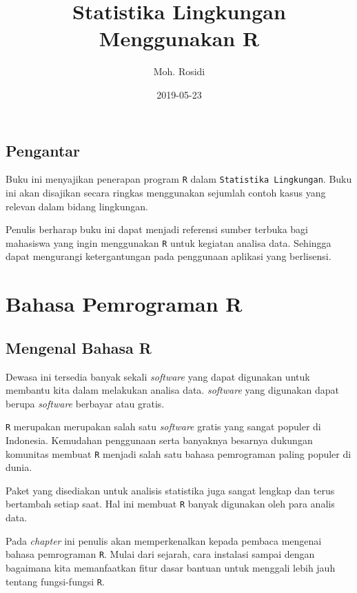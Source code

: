 \documentclass[]{book}
\title{Statistika Lingkungan Menggunakan R}
\author{Moh. Rosidi}
\date{2019-05-23}
\begin{document}
\maketitle

{
\hypersetup{linkcolor=black}
\setcounter{tocdepth}{1}
\tableofcontents
}
\listoftables
\listoffigures
\chapter*{Pengantar}\label{pengantar}

Buku ini menyajikan penerapan program \texttt{R} dalam
\texttt{Statistika\ Lingkungan}. Buku ini akan disajikan secara ringkas
menggunakan sejumlah contoh kasus yang relevan dalam bidang lingkungan.

Penulis berharap buku ini dapat menjadi referensi sumber terbuka bagi
mahasiswa yang ingin menggunakan \texttt{R} untuk kegiatan analisa data.
Sehingga dapat mengurangi ketergantungan pada penggunaan aplikasi yang
berlisensi.

\part*{Bahasa Pemrograman R}\label{part-bahasa-pemrograman-r}

\chapter{Mengenal Bahasa R}\label{mengenal-bahasa-r}

Dewasa ini tersedia banyak sekali \emph{software} yang dapat digunakan
untuk membantu kita dalam melakukan analisa data. \emph{software} yang
digunakan dapat berupa \emph{software} berbayar atau gratis.

\texttt{R} merupakan merupakan salah satu \emph{software} gratis yang
sangat populer di Indonesia. Kemudahan penggunaan serta banyaknya
besarnya dukungan komunitas membuat \texttt{R} menjadi salah satu bahasa
pemrograman paling populer di dunia.

Paket yang disediakan untuk analisis statistika juga sangat lengkap dan
terus bertambah setiap saat. Hal ini membuat \texttt{R} banyak digunakan
oleh para analis data.

Pada \emph{chapter} ini penulis akan memperkenalkan kepada pembaca
mengenai bahasa pemrograman \texttt{R}. Mulai dari sejarah, cara
instalasi sampai dengan bagaimana kita memanfaatkan fitur dasar bantuan
untuk menggali lebih jauh tentang fungsi-fungsi \texttt{R}.
\end{document}
